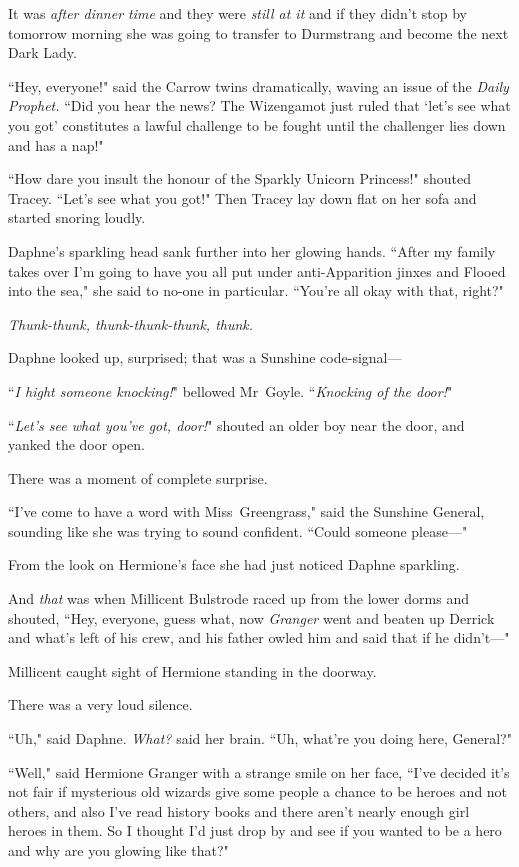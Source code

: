 It was \emph{after dinner time} and they were \emph{still at it} and if they didn't stop by tomorrow morning she was going to transfer to Durmstrang and become the next Dark Lady.

``Hey, everyone!" said the Carrow twins dramatically, waving an issue of the \emph{Daily Prophet.} ``Did you hear the news? The Wizengamot just ruled that `let's see what you got' constitutes a lawful challenge to be fought until the challenger lies down and has a nap!"

``How dare you insult the honour of the Sparkly Unicorn Princess!" shouted Tracey. ``Let's see what you got!" Then Tracey lay down flat on her sofa and started snoring loudly.

Daphne's sparkling head sank further into her glowing hands. ``After my family takes over I'm going to have you all put under anti-Apparition jinxes and Flooed into the sea," she said to no-one in particular. ``You're all okay with that, right?"

\emph{Thunk-thunk, thunk-thunk-thunk, thunk.}

Daphne looked up, surprised; that was a Sunshine code-signal—

``\emph{I hight someone knocking!}" bellowed Mr~Goyle. ``\emph{Knocking of the door!}"

``\emph{Let's see what you've got, door!}" shouted an older boy near the door, and yanked the door open.

There was a moment of complete surprise.

``I've come to have a word with Miss~Greengrass," said the Sunshine General, sounding like she was trying to sound confident. ``Could someone please—"

From the look on Hermione's face she had just noticed Daphne sparkling.

And \emph{that} was when Millicent Bulstrode raced up from the lower dorms and shouted, ``Hey, everyone, guess what, now \emph{Granger} went and beaten up Derrick and what's left of his crew, and his father owled him and said that if he didn't—"

Millicent caught sight of Hermione standing in the doorway.

There was a very loud silence.

``Uh," said Daphne. \emph{What?} said her brain. ``Uh, what're you doing here, General?"

``Well," said Hermione Granger with a strange smile on her face, ``I've decided it's not fair if mysterious old wizards give some people a chance to be heroes and not others, and also I've read history books and there aren't nearly enough girl heroes in them. So I thought I'd just drop by and see if you wanted to be a hero and why are you glowing like that?"

